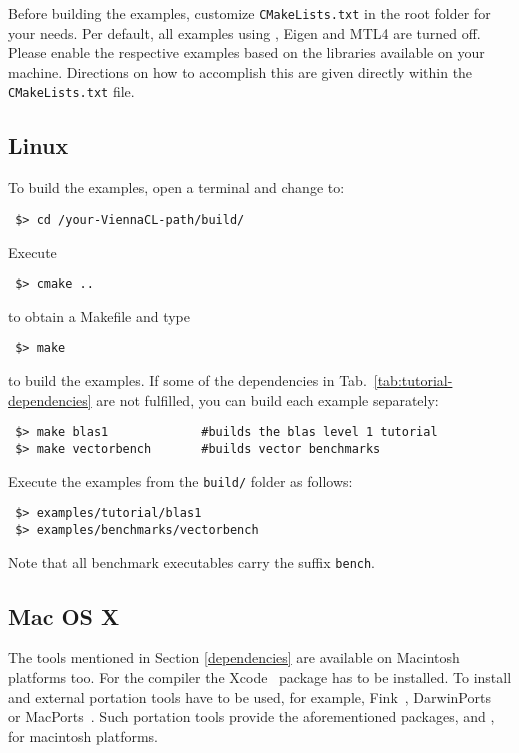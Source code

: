 Before building the examples, customize \texttt{CMakeLists.txt} in the {\ViennaCL} root folder for your needs.
Per default, all examples using {\ublas}, {Eigen} and {MTL4} are turned off.
Please enable the respective examples based on the libraries available on your machine.
Directions on how to accomplish this are given directly within the \texttt{CMakeLists.txt} file.

\subsection{Linux}
To build the examples, open a terminal and change to:
\begin{lstlisting}
 $> cd /your-ViennaCL-path/build/
\end{lstlisting}
Execute
\begin{lstlisting}
 $> cmake ..
\end{lstlisting}
to obtain a Makefile and type
\begin{lstlisting}
 $> make 
\end{lstlisting}
to build the examples. If some of the dependencies in Tab.~\ref{tab:tutorial-dependencies} are not fulfilled, you can build each example separately:
\begin{lstlisting}
 $> make blas1             #builds the blas level 1 tutorial
 $> make vectorbench       #builds vector benchmarks
\end{lstlisting}


Execute the examples from the \lstinline|build/| folder as follows:
\begin{lstlisting}
 $> examples/tutorial/blas1
 $> examples/benchmarks/vectorbench
\end{lstlisting}
Note that all benchmark executables carry the suffix \lstinline|bench|. 

\subsection{Mac OS X}
\label{apple}
The tools mentioned in Section \ref{dependencies} are available on 
Macintosh platforms too. 
For the {\GCC} compiler the Xcode~\cite{xcode} package has to be installed.
To install {\CMake} and {\Boost} external portation tools have to be used, 
for example, Fink~\cite{fink}, DarwinPorts~\cite{darwinports} 
or MacPorts~\cite{macports}. Such portation tools provide the 
aforementioned packages, {\CMake} and {\Boost}, for macintosh platforms. 

